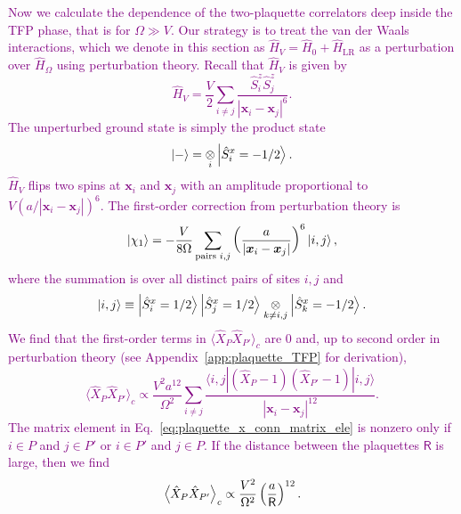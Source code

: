 \documentclass[twocolumn,superscriptaddress,amsmath,amssymb,aps,prx,nofootinbib]{revtex4-2}
\newcommand{\newtext}[1]{\textcolor{purple}{#1}}
\begin{document}
\newtext{Now we calculate the dependence of the two-plaquette correlators deep inside the TFP phase, that is for $\Omega \gg V$. Our strategy is to treat the van der Waals interactions, which we denote in this section as $\hat{H}_V = \hat{H}_0 + \hat{H}_{\text{LR}}$ as a perturbation over $\hat{H}_\Omega$ using  perturbation theory. Recall that $\hat{H}_V$ is given by 
\begin{equation}
\label{eq:H_V}
    \hat{H}_V = \frac{V}{2} \sum_{i\neq j} \frac{\hat{S}_i^z \hat{S}_j^z}{|\bm{x}_i - \bm{x}_j|^6}.
\end{equation}
The unperturbed ground state is simply the product state
\begin{equation}
\label{eq:minus_state_def}
    \ket{-} =  \underset{i}{\otimes} \ket{\hat{S}^x_i = -1/2}.
\end{equation}
$\hat{H}_V$ flips two spins at $\bm{x}_i$ and $\bm{x}_j$ with an amplitude proportional to $V \left( a /|\bm{x}_i - \bm{x}_j | \right)^6$. The first-order correction from perturbation theory is
\begin{equation}
\label{eq:tfp_state_pert1}
    \ket{\chi_1} = -\frac{V}{8\Omega} \sum_{\text{pairs }i,j} \left( \frac{a}{|\bm{x}_i -\bm{x}_j|} \right)^6 \ket{i,j} ,
\end{equation}
where the summation is over all distinct pairs of sites $i, j$ and
\begin{equation}
    \ket{i,j} \equiv \ket{\hat{S}^x_i = 1/2}\ket{\hat{S}^x_j = 1/2} \underset{k \neq i,j}{\otimes}  \ket{\hat{S}^x_k = -1/2}.
\end{equation}
We find that the first-order terms in $\langle \hat{X}_P \hat{X}_{P'} \rangle_c$ are 0 and, up to second order in perturbation theory (see Appendix~\ref{app:plaquette_TFP} for derivation),
\begin{equation}
\label{eq:plaquette_x_conn_matrix_ele}
        \langle \hat{X}_P \hat{X}_{P'}  \rangle_{c} \propto \frac{V^2 a^{12}}{ \Omega^2}  \sum_{i\neq j} \frac{\langle i, j | \left( \hat{X}_P -1\right) \left(   \hat{X}_{P'} -1 \right) | i, j \rangle }{| \bm{x}_i - \bm{x}_j|^{12} }.
\end{equation}
The matrix element in Eq.~\eqref{eq:plaquette_x_conn_matrix_ele} is nonzero only if $i \in P$ and $j \in P'$ or $i \in P'$ and $j \in P$. 
If the distance between the plaquettes $\mathsf{R}$ is large, then we find
\begin{equation}
\label{eq:deep_tfp_state}
    \expval{ \hat{X}_P \hat{X}_{P'} }_{c} \propto \frac{V^2}{\Omega^2 } \left( \frac{a}{\mathsf{R}} \right)^{12}.
\end{equation}}
\end{document}
